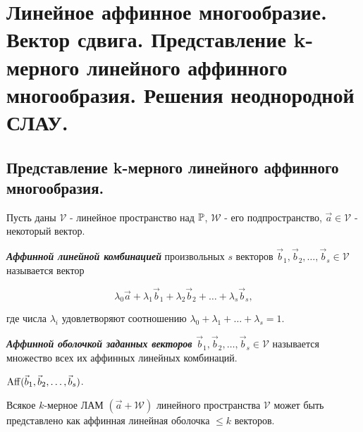 \section{
    Линейное аффинное многообразие. Вектор сдвига. Представление k-мерного линейного аффинного многообразия. Решения неоднородной СЛАУ. 
}

\subsection{
    Представление k-мерного линейного аффинного многообразия.
}

Пусть даны $\mathcal{V}$ - линейное пространство над $\mathbb{P}$, $\mathcal{W}$ - его подпространство, $\vec{a} \in \mathcal{V}$ - некоторый вектор.

\begin{definition}
    \textbf{\textit{Аффинной линейной комбинацией}} произвольных $s$ векторов $\vec{b}_1, \vec{b}_2, \ldots, \vec{b}_s \in \mathcal{V}$ называется вектор

    $$\lambda_0\vec{a} + \lambda_1\vec{b}_1 + \lambda_2\vec{b}_2 +  \ldots + \lambda_s\vec{b}_s,$$

    где числа $\lambda_i$ удовлетворяют соотношению $\lambda_0 + \lambda_1 + \ldots + \lambda_s = 1$.
\end{definition}

\begin{definition}
    \textbf{\textit{Аффинной оболочкой заданных векторов $\vec{b}_1, \vec{b}_2, \ldots, \vec{b}_s \in \mathcal{V}$}} называется множество всех их аффинных линейных комбинаций.
\end{definition}

\begin{designation}
    $\operatorname{\mathop{\mathrm{Aff}}}(\vec{b}_1, \vec{b}_2, \ldots, \vec{b}_s)$.
\end{designation}

\begin{theorem}
    Всякое $k$-мерное ЛАМ $(\vec{a} + \mathcal{W})$ линейного пространства $\mathcal{V}$ может быть представлено как аффинная линейная оболочка $\leq k$ векторов.
\end{theorem}

